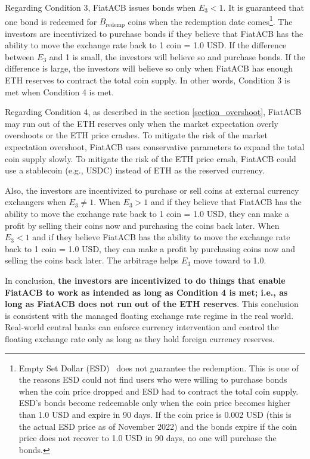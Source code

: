 \documentclass[dvipdfmx,a4paper]{article}
\begin{document}
Regarding Condition 3, FiatACB issues bonds when $E_3<1$. It is guaranteed that one bond is redeemed for $B_{\mathrm{redemp}}$ coins when the redemption date comes\footnote{Empty Set Dollar (ESD)~\cite{emptysetdollar} does not guarantee the redemption. This is one of the reasons ESD could not find users who were willing to purchase bonds when the coin price dropped and ESD had to contract the total coin supply. ESD's bonds become redeemable only when the coin price becomes higher than 1.0 USD and expire in 90 days. If the coin price is 0.002 USD (this is the actual ESD price as of November 2022) and the bonds expire if the coin price does not recover to 1.0 USD in 90 days, no one will purchase the bonds.}. The investors are incentivized to purchase bonds if they believe that FiatACB has the ability to move the exchange rate back to 1 coin = 1.0 USD. If the difference between $E_3$ and 1 is small, the investors will believe so and purchase bonds. If the difference is large, the investors will believe so only when FiatACB has enough ETH reserves to contract the total coin supply. In other words, Condition 3 is met when Condition 4 is met.

Regarding Condition 4, as described in the section \ref{section_overshoot}, FiatACB may run out of the ETH reserves only when the market expectation overly overshoots or the ETH price crashes. To mitigate the risk of the market expectation overshoot, FiatACB uses conservative parameters to expand the total coin supply slowly. To mitigate the risk of the ETH price crash, FiatACB could use a stablecoin (e.g., USDC) instead of ETH as the reserved currency.

Also, the investors are incentivized to purchase or sell coins at external currency exchangers when $E_3\neq 1$. When $E_3>1$ and if they believe that FiatACB has the ability to move the exchange rate back to 1 coin = 1.0 USD, they can make a profit by selling their coins now and purchasing the coins back later. When $E_3<1$ and if they believe FiatACB has the ability to move the exchange rate back to 1 coin = 1.0 USD, they can make a profit by purchasing coins now and selling the coins back later. The arbitrage helps $E_3$ move toward to 1.0.

In conclusion, \textbf{the investors are incentivized to do things that enable FiatACB to work as intended as long as Condition 4 is met; i.e., as long as FiatACB does not run out of the ETH reserves}. This conclusion is consistent with the managed floating exchange rate regime in the real world. Real-world central banks can enforce currency intervention and control the floating exchange rate only as long as they hold foreign currency reserves.
\end{document}
